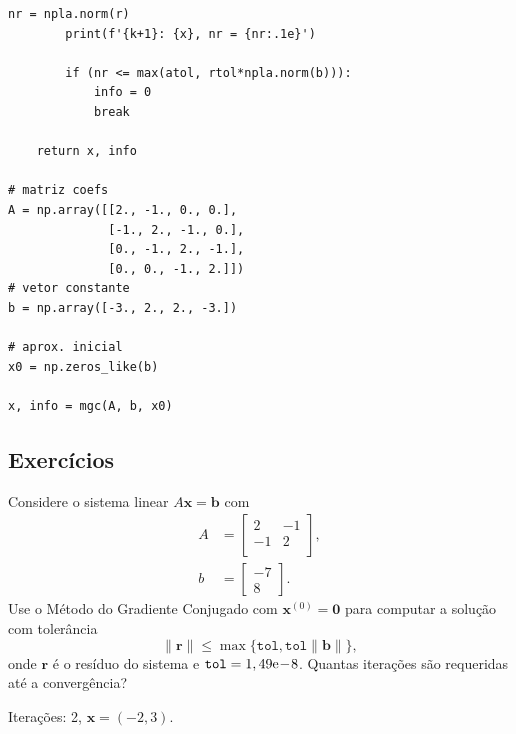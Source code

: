 \begin{ex}
\begin{lstlisting}[caption=mgc.py, label=cap_sislin_sec_metgc:cod:mgc.py]
        nr = npla.norm(r)
        print(f'{k+1}: {x}, nr = {nr:.1e}')

        if (nr <= max(atol, rtol*npla.norm(b))):
            info = 0
            break

    return x, info
            
# matriz coefs
A = np.array([[2., -1., 0., 0.],
              [-1., 2., -1., 0.],
              [0., -1., 2., -1.],
              [0., 0., -1., 2.]])
# vetor constante
b = np.array([-3., 2., 2., -3.])

# aprox. inicial
x0 = np.zeros_like(b)

x, info = mgc(A, b, x0)
\end{lstlisting}
\end{ex}

\subsection*{Exercícios}

\begin{exer}
  Considere o sistema linear $A\pmb{x} = \pmb{b}$ com
  \begin{align}
    A &=
    \begin{bmatrix}
      2 & -1\\
      -1 & 2\\
    \end{bmatrix},\\
    b &=
    \begin{bmatrix}
      -7\\
      8
    \end{bmatrix}.
  \end{align}
  Use o Método do Gradiente Conjugado com $\pmb{x}^{(0)} = \pmb{0}$ para computar a solução com tolerância
  \begin{equation}
    \|\pmb{r}\| \leq \max\{\texttt{tol}, \texttt{tol}\|\pmb{b}\|\},
  \end{equation}
  onde $\pmb{r}$ é o resíduo do sistema e $\texttt{tol} = 1,49\mathrm{e}\!-\!8$. Quantas iterações são requeridas até a convergência?
\end{exer}
\begin{resp}
  Iterações: 2, $\pmb{x} = (-2, 3)$.
\end{resp}

